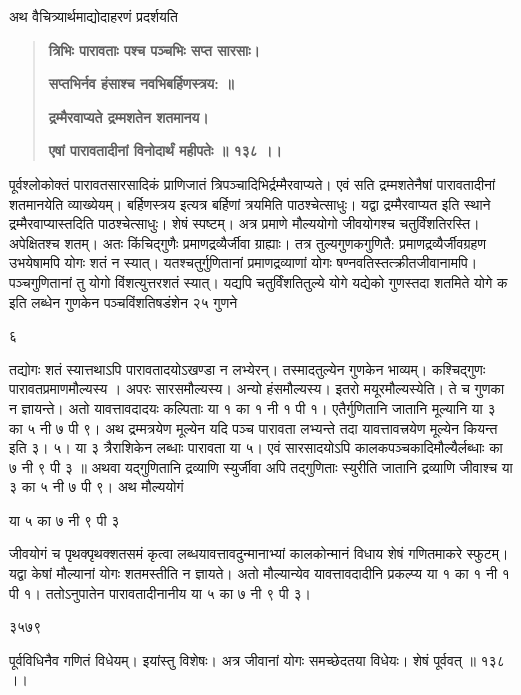 \documentclass[11pt, openany]{book}
\begin{document}
\begin{sloppypar}
\hangindent=0.2in \hspace{0.2in}अथ वैचित्र्यार्थमाद्योदाहरणं प्रदर्शयति\textendash

\begin{quote}
\hspace{1in}\textbf{त्रिभिः पारावताः पश्च पञ्चभिः सप्त सारसाः।}

\hspace{1in}\textbf{सप्तभिर्नव हंसाश्च नवभिबर्हिणस्त्रय: ॥}

\hspace{1in}\textbf{द्रम्मैरवाप्यते द्रम्मशतेन शतमानय।}

\hspace{1in}\textbf{एषां पारावतादीनां विनोदार्थं महीपतेः ॥ १३८ ।।}
\end{quote}

\hangindent=0.2in \hspace{0.2in}पूर्वश्लोकोक्तं पारावतसारसादिकं प्राणिजातं त्रिपञ्चादिभिर्द्रम्मैरवाप्यते। एवं सति द्रम्मशतेनैषां पारावतादीनां शतमानयेति व्याख्येयम्। बर्हिणस्त्रय इत्यत्र बर्हिणां त्रयमिति पाठश्चेत्साधुः। यद्वा द्रम्मैरवाप्यत इति स्थाने द्रम्मैरवाप्यास्तदिति पाठश्चेत्साधुः। शेषं स्पष्टम्। अत्र प्रमाणे मौल्ययोगो जीवयोगश्च चतुर्विंशतिरस्ति। अपेक्षितश्च शतम्। अतः किंचिद्गुणैः प्रमाणद्रव्यैर्जीवा ग्राह्याः। तत्र तुल्यगुणकगुणितै: प्रमाणद्रव्यैर्जीवग्रहण उभयेषामपि योगः शतं न स्यात्। यतश्चतुर्गुणितानां प्रमाणद्रव्याणां योगः षण्नवतिस्तत्क्रीतजीवानामपि। पञ्चगुणितानां तु योगो विंशत्युत्तरशतं स्यात्। यद्यपि चतुर्विंशतितुल्ये योगे यद्येको गुणस्तदा शतमिते योगे क इति लब्धेन गुणकेन पञ्चविंशतिषडंशेन २५ गुणने

६

\hangindent=0.2in तद्योगः शतं स्यात्तथाऽपि पारावतादयोऽखण्डा न लभ्येरन्। तस्मादतुल्येन गुणकेन भाव्यम्। कश्चिद्गुणः पारावतप्रमाणमौल्यस्य । अपरः सारसमौल्यस्य। अन्यो हंसमौल्यस्य। इतरो मयूरमौल्यस्येति। ते च गुणका न ज्ञायन्ते। अतो यावत्तावदादयः कल्पिताः या १ का १ नी १ पी १। एतैर्गुणितानि जातानि मूल्यानि या ३ का ५ नी ७ पी ९। अथ द्रम्मत्रयेण मूल्येन यदि पञ्च पारावता लभ्यन्ते तदा यावत्तावत्त्रयेण मूल्येन कियन्त इति ३। ५। या ३ त्रैराशिकेन लब्धाः पारावता या ५। एवं सारसादयोऽपि कालकपञ्चकादिमौल्यैर्लब्धाः का ७ नी ९ पी ३ ॥ अथवा यद्गुणितानि द्रव्याणि स्युर्जीवा अपि तद्गुणिताः स्युरीति जातानि द्रव्याणि जीवाश्च या ३ का ५ नी ७ पी ९। अथ मौल्ययोगं

\hspace{3in}या ५ का ७ नी ९ पी ३

\hangindent=0.2in जीवयोगं च पृथक्पृथक्शतसमं कृत्वा लब्धयावत्तावदुन्मानाभ्यां कालकोन्मानं विधाय शेषं गणितमाकरे स्फुटम्। यद्वा केषां मौल्यानां योगः शतमस्तीति न ज्ञायते। अतो मौल्यान्येव यावत्तावदादीनि प्रकल्प्य या १ का १ नी १ पी १। ततोऽनुपातेन पारावतादीनानीय या ५ का ७ नी ९ पी ३। 

\hspace{4.2in}३\hspace{0.3in}५\hspace{0.3in}७\hspace{0.25in}९
 
\hangindent=0.2in पूर्वविधिनैव गणितं विधेयम्। इयांस्तु विशेषः।
अत्र जीवानां योगः समच्छेदतया विधेयः। शेषं पूर्ववत् ॥ १३८ ।।
\end{sloppypar}
\thispagestyle{empty}
\newpage
\end{document}
